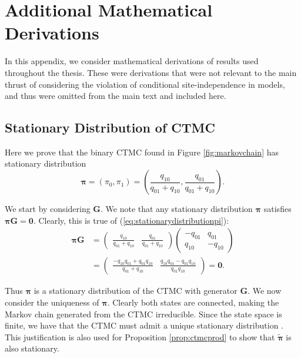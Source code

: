 \chapter{Additional Mathematical Derivations}

In this appendix, we consider mathematical derivations of results used throughout the thesis. These were derivations that were not relevant to the main thrust of considering the violation of conditional site-independence in models, and thus were omitted from the main text and included here.


\section{Stationary Distribution of CTMC}
\label{app:stationaryprob}
Here we prove that the binary CTMC found in Figure \ref{fig:markovchain} has stationary distribution \begin{equation}
\label{eq:stationarydistributionpi}
\boldsymbol{\pi} = (\pi_0, \pi_1) = \left(\frac{q_{10}}{q_{01}+q_{10}}, \frac{q_{01}}{q_{01}+q_{10}}\right).
\end{equation}

We start by considering $\mathbf{G}$. We note that any stationary distribution $\boldsymbol{\pi}$ satisfies $\boldsymbol{\pi}\mathbf{G} = \boldsymbol{0}$. Clearly, this is true of (\ref{eq:stationarydistributionpi}):
\begin{align}
    \boldsymbol{\pi}\mathbf{G} &= \begin{pmatrix}\frac{q_{10}}{q_{01}+q_{10}} & \frac{q_{01}}{q_{01}+q_{10}}\end{pmatrix} \begin{pmatrix}
        -q_{01} & q_{01} \\ q_{10} & -q_{10}
    \end{pmatrix} \\
    &= \begin{pmatrix}\frac{-q_{10}q_{01} +  q_{01}q_{10}}{q_{01}+q_{10}} & \frac{q_{10}q_{01} - q_{01}q_{10}}{q_{01}q_{10}}\end{pmatrix} = \mathbf{0}.
\end{align}

Thus $\boldsymbol{\pi}$ is a stationary distribution of the CTMC with generator $\mathbf{G}$. We now consider the uniqueness of $\boldsymbol{\pi}$. Clearly both states are connected, making the Markov chain generated from the CTMC irreducible. Since the state space is finite, we have that the CTMC must admit a unique stationary distribution \cite{Douc2019}. This justification is also used for Proposition \ref{prop:ctmcprod} to show that $\tilde{\boldsymbol{\pi}}$ is also stationary.

